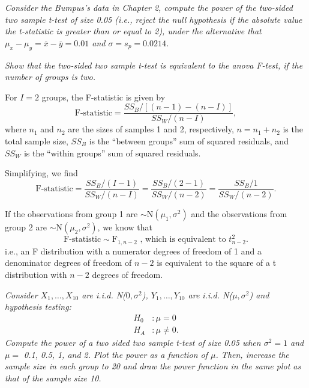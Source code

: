 \documentclass[11pt]{exam} %
\begin{document}
\begin{questions}







\titledquestion{} %
\textit{Consider the Bumpus's data in Chapter 2, compute the power of the two-sided two sample t-test of size 0.05 (i.e., reject the null hypothesis if the absolute value the t-statistic is greater than or equal to 2), under the alternative that $\mu_x - \mu_y = \overline{x} - \overline{y} = 0.01$ and $\sigma = s_p = 0.0214$.}



\titledquestion{} %
\textit{Show that the two-sided two sample t-test is equivalent to the anova F-test, if the number of groups is two.}


For $I=2$ groups, the F-statistic is given by
$$ \text{F-statistic} =  \frac{SS_B / \left[ (n-1) - (n-I) \right]}{SS_W / (n-I)}, $$
where $n_1$ and $n_2$ are the sizes of samples 1 and 2, respectively, $n=n_1+n_2$ is the total sample size, $SS_B$ is the ``between groups'' sum of squared residuals, and $SS_W$ is the ``within groups'' sum of squared residuals.

Simplifying, we find
$$\text{F-statistic} =  \frac{SS_B / (I-1) }{SS_W / (n-I)} = \frac{SS_B / (2-1) }{SS_W / (n-2)} = \frac{SS_B / 1 }{SS_W / (n-2)}.$$

If the observations from group 1 are $\sim \text{N}(\mu_1, \sigma^2)$ and the observations from group 2 are $\sim \text{N}(\mu_2, \sigma^2)$, we know that
$$\text{F-statistic} \sim \text{F}_{1, n-2} \text{ , which is equivalent to }t^2_{n-2}.$$
i.e., an F distribution with a numerator degrees of freedom of 1 and a denominator degrees of freedom of $n-2$ is equivalent to the square of a t distribution with $n-2$ degrees of freedom.



\titledquestion{} %
\textit{Consider $X_1,\ldots,X_{10}$ are i.i.d. N($0,\sigma^2$), $Y_1,\ldots,Y_{10}$ are i.i.d. N($\mu,\sigma^2$) and hypothesis testing:}
\begin{align*}
H_0 &: \mu = 0\\
H_A &: \mu \neq 0.
\end{align*}
\textit{Compute the power of a two sided two sample t-test of size 0.05 when $\sigma^2 = 1$ and $\mu =$ 0.1, 0.5, 1, and 2. Plot the power as a function of $\mu$. Then, increase the sample size in each group to 20 and draw the power function in the same plot as that of the sample size 10.}


\end{questions}
\end{document}

